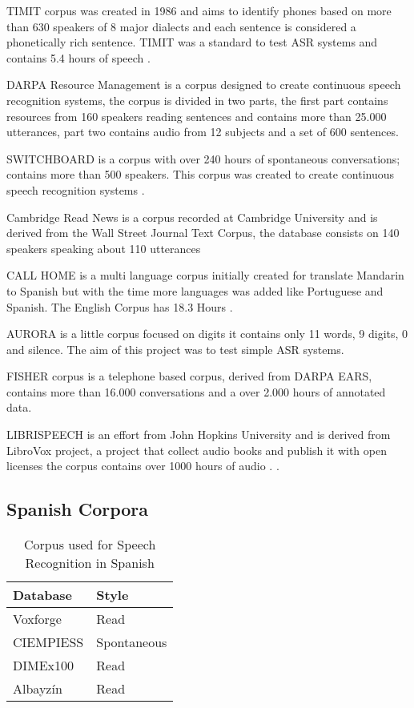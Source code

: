 TIMIT corpus was created in 1986 and aims to identify phones based on more than 630 speakers of 8 major dialects and each sentence is considered a phonetically rich sentence. TIMIT was a standard to test ASR systems and contains 5.4 hours of speech \cite{PriceTheRecognition}.

DARPA Resource Management is a corpus designed to create continuous speech recognition systems, the corpus is divided in two parts, the first part contains resources from 160 speakers reading sentences and contains more than 25.000 utterances, part two contains audio from 12 subjects and a set of 600 sentences. \cite{Lucke1992ExpandingCorpus}

SWITCHBOARD is a corpus with over 240 hours of spontaneous conversations; contains more than 500 speakers. This corpus was created to create continuous speech recognition systems \cite{Godfrey1992SWITCHBOARD:Development}.

Cambridge Read News is a corpus recorded at Cambridge University and is derived from the Wall Street Journal Text Corpus, the database consists on 140 speakers speaking about 110 utterances\cite{RobinsonWSJCAM0:RECOGNITION}

CALL HOME is a multi language corpus initially created for translate Mandarin to Spanish but with the time more languages was added like Portuguese and Spanish. The English Corpus has 18.3 Hours \cite{Fu-HuaLiuSpeechCorpus}.

AURORA is a little corpus focused on digits it contains only 11 words, 9 digits, 0 and silence. The aim of this project was to test simple ASR systems.

FISHER corpus is a telephone based corpus, derived from DARPA EARS, contains more than 16.000 conversations and a over 2.000 hours of annotated data\cite{CieriTheSpeech-to-Text}.

LIBRISPEECH is an effort from John Hopkins University and is derived from LibroVox project, a project that collect audio books and publish it with open licenses the corpus contains over 1000 hours of audio \cite{PanayotovLIBRISPEECH:BOOKS}.
\cite{EvansEfficientCorpus}.
\subsection{Spanish Corpora}
\begin{table}
\centering
\caption{Corpus used for Speech Recognition in Spanish}
\label{tab2}
\begin{tabular}{|l|l|}
\hline
Database & Style \\
\hline
Voxforge & Read   \\
\hline
CIEMPIESS\cite{Hernandez-MenaCIEMPIESS:Corpus} & Spontaneous  \\
\hline
DIMEx100\cite{Pineda2004DIMEx100:Spanish} & Read  \\
\hline
Albayzín\cite{CampilloAlbayzinEvaluation} & Read  \\
\hline
\end{tabular}
\end{table}

